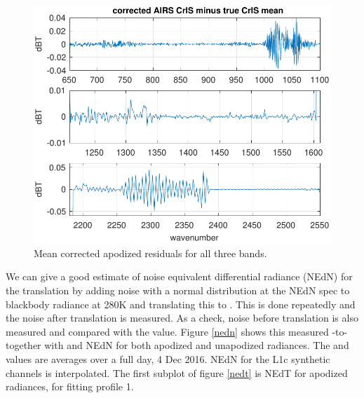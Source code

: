 \documentclass[10pt,twocolumn]{article}  %
\begin{document}
\begin{figure} %
  \centering
  \includegraphics[width=\linewidth]{figures/ap_decon_corr.pdf}
  \caption{Mean corrected apodized residuals for all three bands.}
  \label{statAll1}
\end{figure}


We can give a good estimate of noise equivalent differential
radiance (NEdN) for the translation by adding noise with a normal
distribution at the {\airs} NEdN spec to blackbody radiance at 280K
and translating this to {\cris}.  This is done repeatedly and the
noise after translation is measured.  As a check, noise before
translation is also measured and compared with the {\airs} value.
Figure \ref{nedn} shows this measured {\airs}-to-{\cris} together
with {\airs} and {\cris} NEdN for both apodized and unapodized
radiances.  The {\airs} and {\cris} values are averages over a full
day, 4 Dec 2016.  NEdN for the L1c synthetic channels is
interpolated.  The first subplot of figure \ref{nedt} is NEdT for
apodized radiances, for fitting profile 1.
\end{document}
